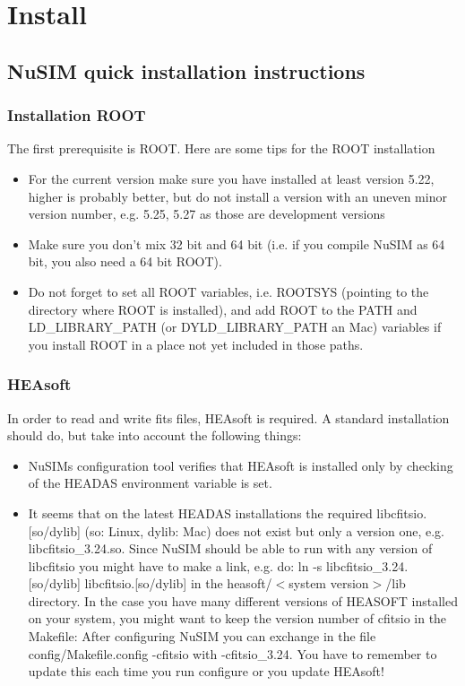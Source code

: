 \chapter{Install}

\section{NuSIM quick installation instructions}
\subsection{Installation ROOT}

The first prerequisite is ROOT. Here are some tips for the ROOT installation
\begin{itemize}
\item For the current version make sure you have installed at least version 5.22, higher is probably  better, but do not install a version with an uneven minor version number, e.g. 5.25, 5.27 as those are development versions
\item Make sure you don't mix 32 bit and 64 bit (i.e. if you compile NuSIM as 64 bit, you also need a 64 bit ROOT).
\item Do not forget to set all ROOT variables, i.e. ROOTSYS (pointing to the directory where ROOT is installed), and add ROOT to the PATH and LD\_LIBRARY\_PATH (or DYLD\_LIBRARY\_PATH an Mac) variables if you install ROOT in a place not yet included in those paths. 
\end{itemize}

\subsection{HEAsoft}
In order to read and write fits files, HEAsoft is required. A standard installation should do, but take into account the following things:
\begin{itemize}
\item	NuSIMs configuration tool verifies that HEAsoft is installed only by checking of the HEADAS environment variable is set.
\item	It seems that on the latest HEADAS installations the required libcfitsio.[so/dylib] (so: Linux, dylib: Mac) does not exist but 
only a version one, e.g. libcfitsio\_3.24.so. Since NuSIM should be able to run with any version of libcfitsio you might have to make a link, e.g. do:
ln -s libcfitsio\_3.24.[so/dylib] libcfitsio.[so/dylib]
in the heasoft/$<$system version$>$/lib directory.
In the case you have many different versions of HEASOFT installed on your system, you might want to keep the version number of cfitsio in the Makefile:
After configuring NuSIM you can exchange in the file config/Makefile.config -cfitsio with -cfitsio_3.24.
You have to remember to update this each time you run configure or you update HEAsoft!
\end{itemize}

